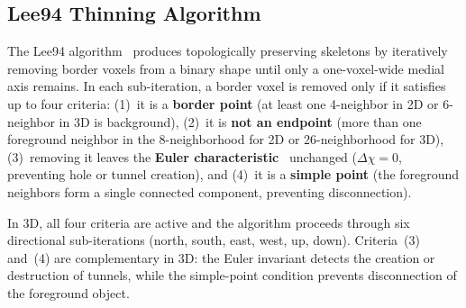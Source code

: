 \documentclass[11pt]{article}
\begin{document}
%
%
%
%
%

\subsection{Lee94 Thinning Algorithm}\label{sec:methods:lee}

The Lee94 algorithm~\cite{lee94} produces topologically
preserving skeletons by iteratively removing border voxels from a
binary shape until only a one-voxel-wide medial axis remains. In each
sub-iteration, a border voxel is removed only if it satisfies up to
four criteria:
(1)~it is a \textbf{border point} (at least one 4-neighbor in 2D or
6-neighbor in 3D is background),
(2)~it is \textbf{not an endpoint} (more than one foreground neighbor
in the 8-neighborhood for 2D or 26-neighborhood for 3D),
(3)~removing it leaves the \textbf{Euler
characteristic}~\cite{lee_winding_1991} unchanged
($\Delta\chi = 0$, preventing hole or tunnel creation), and
(4)~it is a \textbf{simple point} (the foreground neighbors form a
single connected component, preventing disconnection).

In 3D, all four criteria are active and the algorithm proceeds through
six directional sub-iterations (north, south, east, west, up, down).
Criteria~(3) and~(4) are complementary in 3D: the Euler invariant
detects the creation or destruction of tunnels, while the simple-point
condition prevents disconnection of the foreground object.
\end{document}
